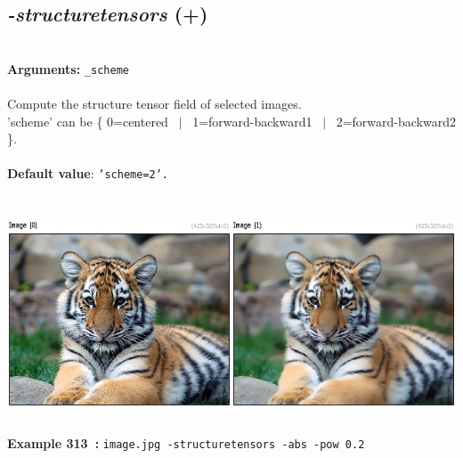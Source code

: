 \documentclass[a4paper,11pt,twoside]{book}
\begin{document}
\subsection{\emph{-structuretensors} (+)}\vspace*{-0.5em}
~\\\textbf{Arguments: } 
{\small \texttt{\_scheme}}\\~\\
Compute the structure tensor field of selected images.
~\\'scheme' can be \{ 0=centered ~$|$~ 1=forward-backward1 ~$|$~ 2=forward-backward2 \}.
~\\~\\\textbf{Default value}: {\small \texttt{'scheme=2'.}}
\begin{center}\includegraphics[keepaspectratio=true,height=7cm,width=\textwidth]{img/gmic_def313.jpg}\\
{\footnotesize \textbf{Example 313~:} \texttt{image.jpg -structuretensors -abs -pow 0.2}}
\end{center}
\end{document}
